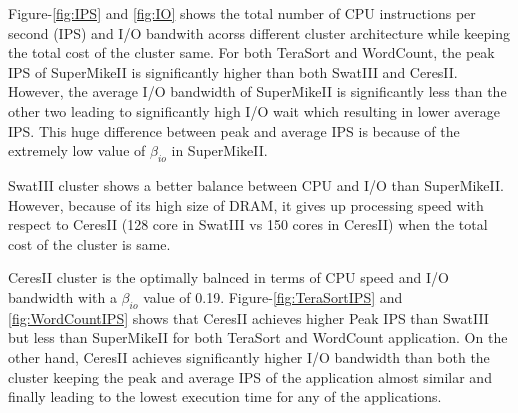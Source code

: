 \documentclass[journal]{IEEEtran}
\begin{document}
Figure-\ref{fig:IPS} and \ref{fig:IO} shows the total number of CPU instructions per second (IPS) and I/O bandwith acorss different cluster architecture while keeping the total cost of the cluster same. For both TeraSort and WordCount, the peak IPS of SuperMikeII is significantly higher than both SwatIII and CeresII. However, the average I/O bandwidth of SuperMikeII is significantly less than the other two leading to significantly high I/O wait which resulting in lower average IPS. This huge difference between peak and average IPS is because of the extremely low value of $\beta_{io}$ in SuperMikeII.

SwatIII cluster shows a better balance between CPU and I/O than SuperMikeII. However, because of its high size of DRAM, it gives up processing speed with respect to CeresII (128 core in SwatIII vs 150 cores in CeresII) when the total cost of the cluster is same. 

CeresII cluster is the optimally balnced in terms of CPU speed and I/O bandwidth with a $\beta_{io}$ value of 0.19. Figure-\ref{fig:TeraSortIPS} and \ref{fig:WordCountIPS} shows that CeresII achieves higher Peak IPS than SwatIII but less than SuperMikeII for both TeraSort and WordCount application. On the other hand, CeresII achieves significantly higher I/O bandwidth than both the cluster keeping the peak and average IPS of the application almost similar and finally leading to the lowest execution time for any of the applications.
\end{document}
